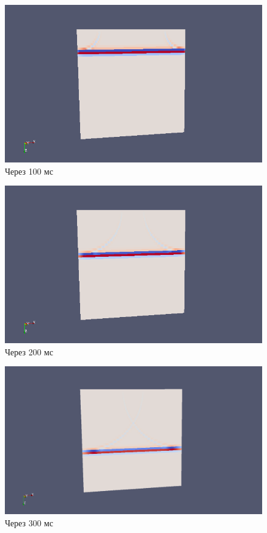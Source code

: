 \documentclass{article}
\begin{document}
\begin{figure}[ht]
  \center
  \includegraphics[scale=0.5]{pic_kirchhoff_scalar/pwave_1.png}
  \caption{Через 100 мс}
\label{img_pwave_1}
\end{figure}
\begin{figure}[ht]
  \center
  \includegraphics[scale=0.5]{pic_kirchhoff_scalar/pwave_2.png}
  \caption{Через 200 мс}
\label{img_pwave_2}
\end{figure}
\begin{figure}[ht]
  \center
  \includegraphics[scale=0.2]{pic_kirchhoff_scalar/pwave_3.png}
  \caption{Через 300 мс}
\label{img_pwave_3}
\end{figure}
\end{document}
